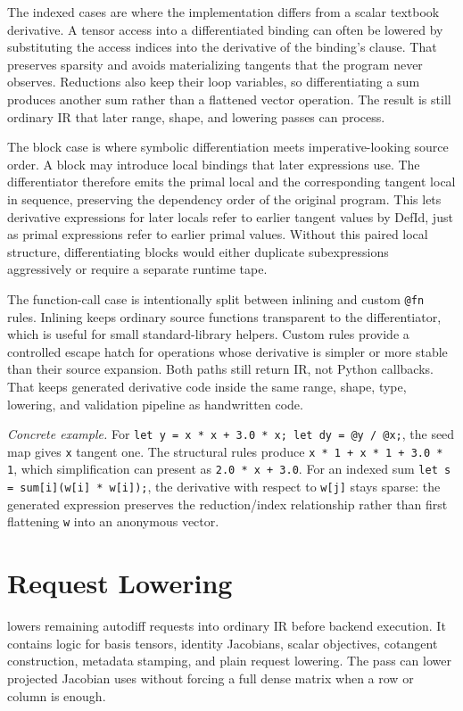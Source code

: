 The indexed cases are where the implementation differs from a scalar textbook
derivative. A tensor access into a differentiated binding can often be lowered
by substituting the access indices into the derivative of the binding's clause.
That preserves sparsity and avoids materializing tangents that the program
never observes. Reductions also keep their loop variables, so differentiating a
sum produces another sum rather than a flattened vector operation. The result
is still ordinary IR that later range, shape, and lowering passes can process.

The block case is where symbolic differentiation meets imperative-looking
source order. A block may introduce local bindings that later expressions use.
The differentiator therefore emits the primal local and the corresponding
tangent local in sequence, preserving the dependency order of the original
program. This lets derivative expressions for later locals refer to earlier
tangent values by DefId, just as primal expressions refer to earlier primal
values. Without this paired local structure, differentiating blocks would either
duplicate subexpressions aggressively or require a separate runtime tape.

The function-call case is intentionally split between inlining and custom
\texttt{@fn} rules. Inlining keeps ordinary source functions transparent to the
differentiator, which is useful for small standard-library helpers. Custom rules
provide a controlled escape hatch for operations whose derivative is simpler or
more stable than their source expansion. Both paths still return IR, not Python
callbacks. That keeps generated derivative code inside the same range, shape,
type, lowering, and validation pipeline as handwritten \einlang{} code.

\textit{Concrete example.} For \texttt{let y = x * x + 3.0 * x; let dy =
@y / @x;}, the seed map gives \texttt{x} tangent one. The structural rules
produce \texttt{x * 1 + x * 1 + 3.0 * 1}, which simplification can present as
\texttt{2.0 * x + 3.0}. For an indexed sum \texttt{let s = sum[i](w[i] *
w[i]);}, the derivative with respect to \texttt{w[j]} stays sparse: the
generated expression preserves the reduction/index relationship rather than
first flattening \texttt{w} into an anonymous vector.

\section{Request Lowering}

 lowers remaining
autodiff requests into ordinary IR before backend execution. It
contains logic for basis tensors, identity Jacobians, scalar objectives,
cotangent construction, metadata stamping, and plain request lowering. The pass
can lower projected Jacobian uses without forcing a full dense matrix when a row
or column is enough.

